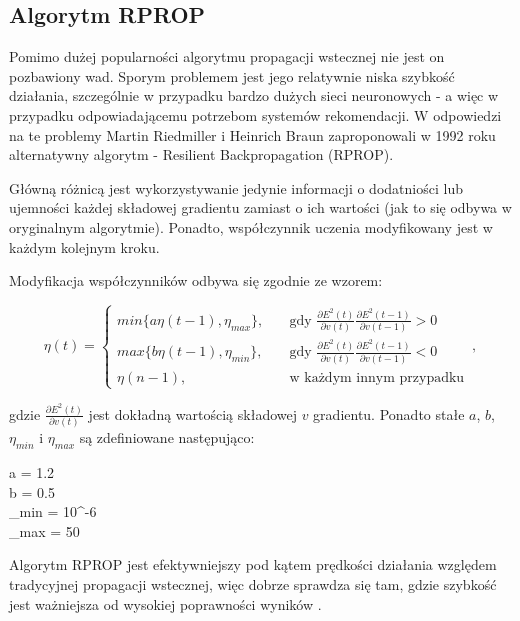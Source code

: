 \documentclass[twoside]{iisthesis}
\begin{document}
 		 \subsection{Algorytm RPROP}		 
		 
		 Pomimo dużej popularności algorytmu propagacji wstecznej nie jest on pozbawiony wad. Sporym problemem jest jego relatywnie niska szybkość działania, szczególnie w przypadku bardzo dużych sieci neuronowych - a więc w przypadku odpowiadającemu potrzebom systemów rekomendacji. W odpowiedzi na te problemy Martin Riedmiller i Heinrich Braun zaproponowali w 1992 roku alternatywny algorytm - Resilient Backpropagation (RPROP).
		 
		 Główną różnicą jest wykorzystywanie jedynie informacji o dodatniości lub ujemności każdej składowej gradientu zamiast o ich wartości (jak to się odbywa w oryginalnym algorytmie). Ponadto, współczynnik uczenia modyfikowany jest w każdym kolejnym kroku. 
		 
		 Modyfikacja współczynników odbywa się zgodnie ze wzorem:
		 
		 \begin{equation}
		 \label{eq:rprop}		 
		 \eta(t) = 
		 \begin{cases}
			min\{a \eta(t-1), \eta_{max}\}, & \quad \text{gdy } \frac{\partial E^2(t)}{\partial v(t)} \frac{\partial E^2(t-1)}{\partial v(t-1)} > 0 \\
			max\{b \eta(t-1), \eta_{min}\}, & \quad \text{gdy } \frac{\partial E^2(t)}{\partial v(t)} \frac{\partial E^2(t-1)}{\partial v(t-1)} < 0 \\
			\eta(n-1), & \quad \text{w każdym innym przypadku} 
		 \end{cases}		 
		 \,,
		 \end{equation}
		 
		 gdzie $\frac{\partial E^2(t)}{\partial v(t)}$ jest dokładną wartością składowej $v$ gradientu. Ponadto stałe $a$, $b$, $\eta_{min}$ i $\eta_{max}$ są zdefiniowane następująco:

		 \begin{conditions*}
		 	a = 1.2 \\
		 	b = 0.5 \\
		 	\eta_{min} = 10^{-6} \\
		 	\eta_{max} = 50
		 \end{conditions*} 
		 
		 Algorytm RPROP jest efektywniejszy pod kątem prędkości działania względem tradycyjnej propagacji wstecznej, więc dobrze sprawdza się tam, gdzie szybkość jest ważniejsza od wysokiej poprawności wyników  \cite{riedmiller1993direct}\cite{riedmiller1994rprop}.
		 		 
\end{document}
